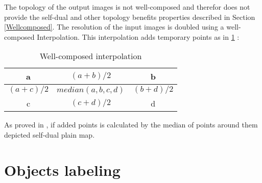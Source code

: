 \par The topology of the output images is not well-composed and therefor does not provide the self-dual and other topology benefits properties described in Section \ref{Wellcomposed}. The resolution of the input images is doubled using a well-composed Interpolation. This interpolation adds temporary points as in \ref{WllCmpInterpolation} :
\par
\begin{table}
	\caption{Well-composed interpolation} \label{WllCmpInterpolation}
	\centering
	\begin{tabular}{|c|c|c|}
	\hline 
	a & ${(a+b)}/{2}$ & b \\ 
	\hline 
	${(a+c)}/{2}$ & $median(a,b,c,d)$ & ${(b+d)}/{2}$ \\ 
	\hline 
	c & ${(c+d)}/{2}$ & d \\ 
	\hline 

	\end{tabular}
	
\end{table}

\par
As proved in \cite{geraud.15.ismm}, if added points is calculated by the median of points around them depicted self-dual plain map.

\section{Objects labeling}

